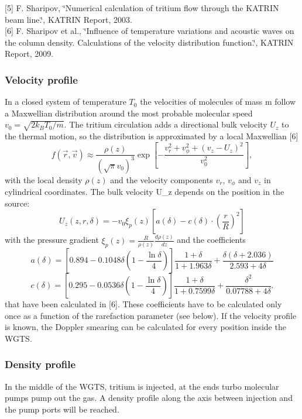 \mbox{[}5\mbox{]} F. Sharipov, \char`\"{}Numerical calculation of tritium flow through the KATRIN beam line.\char`\"{}, KATRIN Report, 2003.\\
\mbox{[}6\mbox{]} F. Sharipov et al., \char`\"{}Influence of temperature variations and acoustic waves on the column density. Calculations of the velocity distribution function.\char`\"{}, KATRIN Report, 2009.

\subsubsection{Velocity profile}\label{_s_s_cmain_velocityprofile}
In a closed system of temperature $T_0$ the velocities of molecules of mass m follow a Maxwellian distribution around the most probable molecular speed $ v_0 = \sqrt{2 k_B T_0 / m}$. The tritium circulation adds a directional bulk velocity $U_z$ to the thermal motion, so the distribution is approximated by a local Maxwellian \mbox{[}6\mbox{]} \[ f(\vec{r}, \vec{v}) \approx \frac{\rho(z)}{(\sqrt{\pi}v_0)^3} \exp \left[-\frac{v_r^2+v_\phi^2+(v_z-U_z)^2}{v_0^2}\right], \label{eq:lokalMB} \] with the local density $\rho(z)$ and the velocity components $v_r$, $v_\phi$ and $v_z$ in cylindrical coordinates. The bulk velocity U\_\-z depends on the position in the source: \[ U_z(z,r,\delta)=-v_0\xi_p(z)\left[a(\delta) - c(\delta)\cdot \left(\frac{r}{R}\right)^2\right] \] with the pressure gradient $\xi_p(z)= \frac{R}{\rho(z)}\frac{d\rho(z)}{dz}$ and the coefficients \[ a(\delta)=\left[0.894 - 0.1048 \delta \left(1-\frac{\ln \delta}{4}\right)\right]\frac{1 + \delta}{1+1.963\delta}+ \frac{\delta(\delta+2.036)}{2.593+4\delta} \] \[ c(\delta)= \left[0.295 - 0.0536 \delta\left(1- \frac{\ln \delta}{4}\right)\right]\frac{1 + \delta}{1+ 0.7599\delta}+ \frac{\delta^2}{0.07788 + 4\delta}. \] that have been calculated in \mbox{[}6\mbox{]}. These coefficients have to be calculated only once as a function of the rarefaction parameter (see below). If the velocity profile is known, the Doppler smearing can be calculated for every position inside the WGTS.


\subsubsection{Density profile}\label{_s_s_cmain_densityprofile}
In the middle of the WGTS, tritium is injected, at the ends turbo molecular pumps pump out the gas. A density profile along the axis between injection and the pump ports will be reached.

